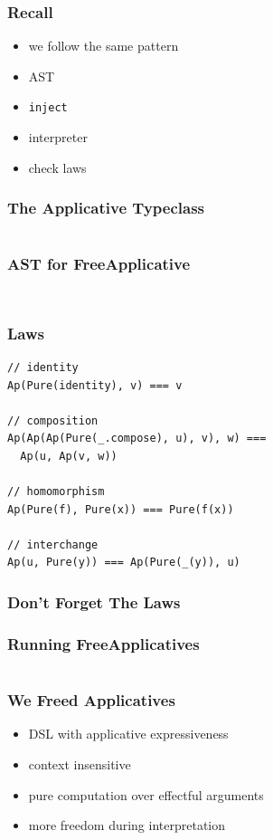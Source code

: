 \documentclass{beamer}
\newcommand{\recipe}{%
  \begin{itemize}
  \item AST
  \item \texttt{inject}
  \item interpreter
  \item check laws
  \end{itemize}
}
\begin{document}
\begin{frame}
  \frametitle{Recall}
  \begin{itemize}
  \item we follow the same pattern
  \end{itemize}
  \recipe{}
\end{frame}

\begin{frame}[fragile]
  \frametitle{The Applicative Typeclass}
  \inputminted{scala}{snippets/applicative-typeclass.scala}
\end{frame}

\begin{frame}[fragile]
  \frametitle{AST for FreeApplicative}
    \inputminted{scala}{snippets/free-applicative.scala}
  \begin{verbatim}
\end{verbatim}
\end{frame}

\begin{frame}[fragile]
  \frametitle{Laws}
\begin{verbatim}
// identity
Ap(Pure(identity), v) === v

// composition
Ap(Ap(Ap(Pure(_.compose), u), v), w) ===
  Ap(u, Ap(v, w))

// homomorphism
Ap(Pure(f), Pure(x)) === Pure(f(x))

// interchange
Ap(u, Pure(y)) === Ap(Pure(_(y)), u)
\end{verbatim}
\end{frame}

\begin{frame}
  \frametitle{Don't Forget The Laws}
\end{frame}

\begin{frame}
  \frametitle{Running FreeApplicatives}
  \inputminted{scala}{snippets/freeap-interp.scala}
\end{frame}

\begin{frame}
  \frametitle{We Freed Applicatives}
  \begin{itemize}
  \item DSL with applicative expressiveness
  \item context insensitive
  \item pure computation over effectful arguments
  \item more freedom during interpretation
  \end{itemize}
\end{frame}
\end{document}
